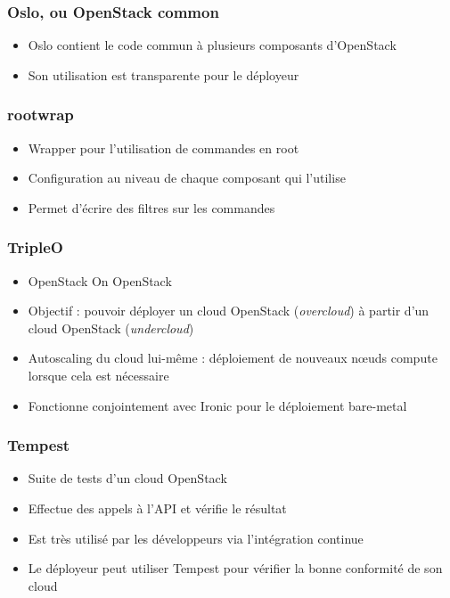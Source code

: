   \begin{frame}
    \frametitle{Oslo, ou OpenStack common}
    \begin{itemize}
      \item Oslo contient le code commun à plusieurs composants d'OpenStack
      \item Son utilisation est transparente pour le déployeur
    \end{itemize}
  \end{frame}

  \begin{frame}
    \frametitle{rootwrap}
    \begin{itemize}
      \item Wrapper pour l'utilisation de commandes en root
      \item Configuration au niveau de chaque composant qui l'utilise
      \item Permet d'écrire des filtres sur les commandes
    \end{itemize}
  \end{frame}

  \begin{frame}
    \frametitle{TripleO}
    \begin{itemize}
      \item OpenStack On OpenStack
      \item Objectif : pouvoir déployer un cloud OpenStack (\textit{overcloud}) à partir d'un cloud OpenStack (\textit{undercloud})
      \item Autoscaling du cloud lui-même : déploiement de nouveaux nœuds compute lorsque cela est nécessaire
      \item Fonctionne conjointement avec Ironic pour le déploiement bare-metal
    \end{itemize}
  \end{frame}

  \begin{frame}
    \frametitle{Tempest}
    \begin{itemize}
      \item Suite de tests d'un cloud OpenStack
      \item Effectue des appels à l'API et vérifie le résultat
      \item Est très utilisé par les développeurs via l'intégration continue
      \item Le déployeur peut utiliser Tempest pour vérifier la bonne conformité de son cloud
    \end{itemize}
  \end{frame}


